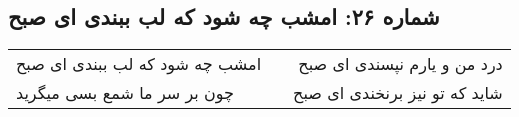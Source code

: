 \begin{center}
\section*{شماره ۲۶: امشب چه شود که لب ببندی ای صبح}
\label{sec:026}
\begin{longtable}{l p{0.5cm} r}
امشب چه شود که لب ببندی ای صبح
&&
درد من و یارم نپسندی ای صبح
\\
چون بر سر ما شمع بسی میگرید
&&
شاید که تو نیز برنخندی ای صبح
\\
\end{longtable}
\end{center}
